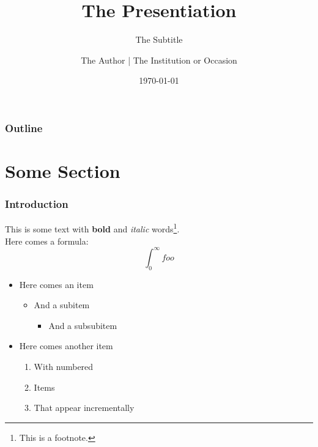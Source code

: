 \documentclass[t]{beamer}
\title{\Huge{%
    The Presentiation
}}
\subtitle{\Large{%
    The Subtitle
}}
\author{\small{%
    The Author | The Institution or Occasion
}}
\date{\small{%
    \today
}}
\begin{document}

\newcommand{\highlightitem}[1]{
  \only<\currentsection>{\textcolor{highlight}{#1}}
  \only<\notcurrentsection>{\textcolor{faded}{#1}}
}
\begin{frame}
    \titlepage
\end{frame}

\begin{frame}
    \frametitle{Outline}
    \tableofcontents %
\end{frame}

\section{Some Section}
\begin{frame}
    \frametitle{Introduction}
    This is some text with \textbf{bold} and \textit{italic} words\footnote{This is a footnote.}.\\
    \pause
    Here comes a formula:
    \[
        \int_0^\infty foo
    \]
    \pause
    \begin{itemize}
        \item Here comes an item
            \begin{itemize}
                \item And a subitem
                    \begin{itemize}
                        \item And a subsubitem
                    \end{itemize}
            \end{itemize}
        \pause
        \item Here comes another item
            \begin{enumerate}
                \item With numbered
                    \pause
                \item Items
                    \pause
                \item That appear incrementally
            \end{enumerate}
    \end{itemize}
\end{frame}
\end{document}
